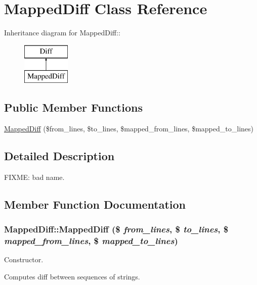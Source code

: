 \hypertarget{classMappedDiff}{
\section{MappedDiff Class Reference}
\label{classMappedDiff}
}
Inheritance diagram for MappedDiff::\begin{figure}[H]
\begin{center}
\leavevmode
\includegraphics[height=2cm]{classMappedDiff}
\end{center}
\end{figure}
\subsection*{Public Member Functions}
\begin{CompactItemize}
\item 
\hyperlink{classMappedDiff_3d02bb1a39127b4f53cebf44d1a36a5f}{MappedDiff} (\$from\_\-lines, \$to\_\-lines, \$mapped\_\-from\_\-lines, \$mapped\_\-to\_\-lines)
\end{CompactItemize}


\subsection{Detailed Description}
FIXME: bad name. 

\subsection{Member Function Documentation}
\hypertarget{classMappedDiff_3d02bb1a39127b4f53cebf44d1a36a5f}{
\subsubsection[{MappedDiff}]{\setlength{\rightskip}{0pt plus 5cm}MappedDiff::MappedDiff (\$ {\em from\_\-lines}, \/  \$ {\em to\_\-lines}, \/  \$ {\em mapped\_\-from\_\-lines}, \/  \$ {\em mapped\_\-to\_\-lines})}}
\label{classMappedDiff_3d02bb1a39127b4f53cebf44d1a36a5f}


Constructor.

Computes diff between sequences of strings.

